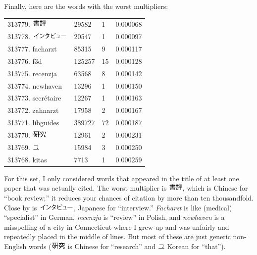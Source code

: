 \documentclass[twocolumn]{article}
\begin{document}
Finally, here are the words with the worst multipliers:
\begin{tabular}{l|l|l|l}
313779.  \includegraphics[width=2em]{bookreview} & 29582 & 1 & 0.000068 \\
313778.  \includegraphics[width=5em]{interview} & 20547 & 1 & 0.000097 \\
313777.  facharzt & 85315 & 9 & 0.000117 \\
313776.  f3d & 125257 & 15 & 0.000128 \\
313775.  recenzja & 63568 & 8 & 0.000142 \\
313774.  newhaven & 13296 & 1 & 0.000150 \\
313773.  secr\'etaire & 12267 & 1 & 0.000163 \\
313772.  zahnarzt & 17958 & 2 & 0.000167 \\
313771.  libguides & 389727 & 72 & 0.000187 \\
313770.  \includegraphics[width=2em]{research} & 12961 & 2 & 0.000231 \\
313769.  \includegraphics[width=1em]{that} & 15984 & 3 & 0.000250 \\
313768.  kitas & 7713 & 1 & 0.000259 \\
\end{tabular}

For this set, I only considered words that appeared in the title of at
least one paper that was actually cited. The worst multiplier is
\includegraphics[width=2em]{bookreview}, which is Chinese for ``book
review;'' it reduces your chances of citation by more than ten
thousandfold. Close by is \includegraphics[width=5em]{interview},
Japanese for ``interview.'' {\em Facharzt} is like (medical)
``specialist'' in German, {\em recenzja} is ``review'' in Polish, and
{\em newhaven} is a misspelling of a city in Connecticut where I grew
up and was unfairly and repeatedly placed in the middle of lines. But
most of these are just generic non-English words
(\includegraphics[width=2em]{research} is Chinese for ``research'' and
\includegraphics[width=1em]{that} Korean for ``that'').
\end{document}
